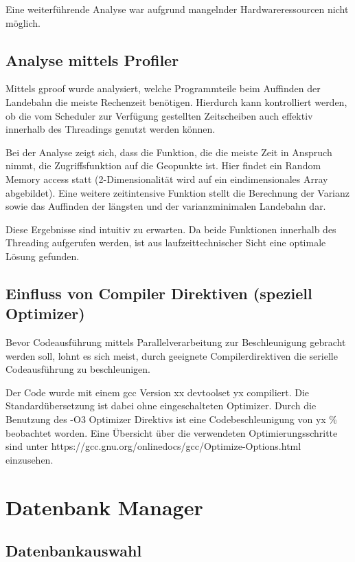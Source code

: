 \documentclass[10pt,a4paper]{report}
\begin{document}
Eine weiterführende Analyse war aufgrund mangelnder Hardwareressourcen nicht möglich.


\section{Analyse mittels Profiler}

Mittels gproof wurde analysiert, welche Programmteile beim Auffinden der Landebahn die meiste Rechenzeit benötigen. Hierdurch kann kontrolliert werden, ob die vom Scheduler zur Verfügung gestellten Zeitscheiben auch effektiv innerhalb des Threadings genutzt werden können. 

Bei der Analyse zeigt sich, dass die Funktion, die die meiste Zeit in Anspruch nimmt, die Zugriffsfunktion auf die Geopunkte ist. Hier findet ein Random Memory access statt (2-Dimensionalität wird auf ein eindimensionales Array abgebildet).
Eine weitere zeitintensive Funktion stellt die Berechnung der Varianz sowie das Auffinden der längsten und der varianzminimalen Landebahn dar.

Diese Ergebnisse sind intuitiv zu erwarten.
Da beide Funktionen innerhalb des Threading aufgerufen werden, ist aus laufzeittechnischer Sicht eine optimale Lösung gefunden. 

\section{Einfluss von Compiler Direktiven (speziell Optimizer)}

Bevor Codeausführung mittels Parallelverarbeitung zur Beschleunigung gebracht werden soll, lohnt es sich meist, durch geeignete Compilerdirektiven die serielle Codeausführung zu beschleunigen.

Der Code wurde mit einem gcc Version xx devtoolset yx compiliert. Die Standardübersetzung ist dabei ohne eingeschalteten Optimizer. 
Durch die Benutzung des -O3 Optimizer Direktivs ist eine Codebeschleunigung von yx \% beobachtet worden. 
Eine Übersicht über die verwendeten Optimierungsschritte sind unter https://gcc.gnu.org/onlinedocs/gcc/Optimize-Options.html einzusehen.

\chapter{Datenbank Manager}
\section{Datenbankauswahl}
\end{document}
